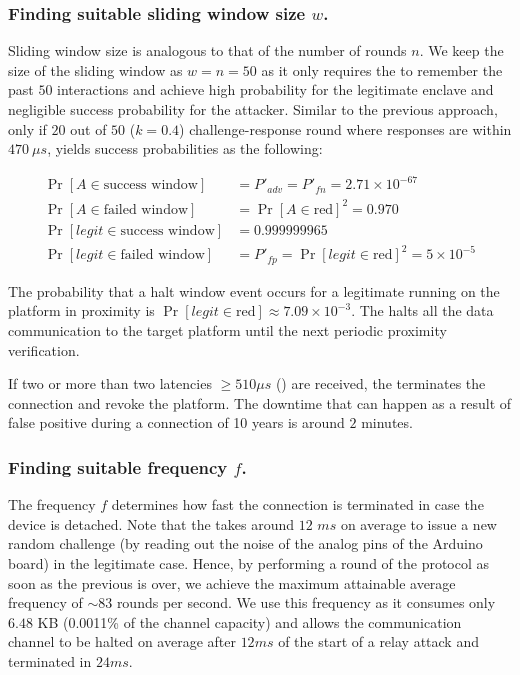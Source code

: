 \subsubsection{Finding suitable sliding window size $w$.} Sliding window size is analogous to that of the number of rounds $n$. We keep  the size of the sliding window as $w=n=50$ as it only requires the \device to remember the past $50$ interactions and achieve high probability for the legitimate enclave and negligible success probability for the attacker. Similar to the previous approach, only if $20$ out of $50$ ($k=0.4$) challenge-response round where responses are within $470\ \mu s$, \name yields success probabilities as the following:

\begin{align*}
 \Pr[A \in \text{success window}]&=P'_{adv} = P'_{fn}= 2.71\times 10^{-67}\\
 \Pr[A \in \text{failed window}]&=\Pr[A\in\text{red}]^2=0.970\\
 \Pr[legit \in \text{success window}]&=0.999999965\\
 \Pr[legit \in \text{failed window}]&=P'_{fp}=\Pr[legit\in\text{red}]^2=5\times10^{-5}
\end{align*}

The probability that a halt window event occurs for a legitimate \app running on the platform in proximity is $\Pr[legit\in\text{red}]\approx 7.09\times10^{-3}$. The \device halts all the data communication to the target platform until the next periodic proximity verification.

If two or more than two latencies $\geq 510\mu s$ (\detach) are received, the \device terminates the connection and revoke the platform. The downtime that can happen as a result of false positive during a connection of 10 years is around $2$ minutes.

\subsubsection{Finding suitable frequency $f$.} The frequency $f$ determines how fast the connection is terminated in case the \device device is detached. Note that the \device takes around $12$ $ms$ on average to issue a new random challenge (by reading out the noise of the analog pins of the Arduino board) in the legitimate case. Hence, by performing a round of the protocol as soon as the previous is over, we achieve the maximum attainable average frequency of $\sim83$ rounds per second. We use this frequency as it consumes only $6.48$ KB (0.0011\% of the 
channel capacity) and allows the communication channel to be halted on average after $12 ms$ of the start of a relay attack and terminated in $24 ms$.

